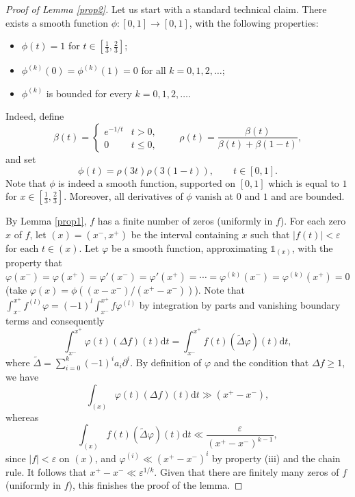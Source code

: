 \documentclass[12pt, a4paper]{amsart}
\theoremstyle{remark}
\newcommand{\ud}{\mathrm{d}}
\begin{document}
\begin{proof}[Proof of Lemma \ref{prop2}] Let us start with a standard technical claim.
    There exists a smooth function $\phi : [0, 1]\to [0, 1]$, with the following properties: \begin{itemize}
        \item[(i)] $\phi(t) = 1$ for $t\in[\frac{1}{3}, \frac23]$;
        \item[(ii)] $\phi^{(k)}(0) = \phi^{(k)}(1) = 0$ for all $k=0, 1, 2, \ldots$;
        \item[(iii)] $\phi^{(k)}$ is bounded for every $k=0, 1, 2, \ldots$.
    \end{itemize}
    Indeed, define
\begin{equation}\label{eq:rho}
\beta(t)=
\begin{cases}
e^{-1/t} & t>0,\\[2mm]
0 & t\le 0,
\end{cases}
\qquad
\rho(t)=\frac{\beta(t)}{\beta(t)+\beta(1-t)},
\end{equation}
and set
\[
\phi(t)=\rho\left(3t\right)\rho\left(3(1-t)\right),\qquad t\in [0, 1].
\]
Note that $\phi$ is indeed a smooth function, supported on $[0, 1]$ which is equal to $1$ for $x\in [\frac 13, \frac 23]$. Moreover, all derivatives of $\phi$ vanish at $0$ and $1$ and are bounded. 

By Lemma \ref{prop1}, $f$ has a finite number of zeros (uniformly in $f$). For each zero $x$ of $f$, let $(x) = (x^-, x^+)$ be the interval containing $x$ such that $\lvert f(t)\rvert<\varepsilon$ for each $t\in (x)$. Let $\varphi$ be a smooth function, approximating $\mathds1_{(x)}$, with the property that $\varphi(x^-) = \varphi(x^+)=\varphi'(x^-)=\varphi'(x^+) = \cdots = \varphi^{(k)}(x^-) = \varphi^{(k)}(x^+) = 0$ (take $\varphi(x) = \phi((x-x^{-})/(x^+ - x^-))$). Note that 
$\int_{x^-}^{x^+} f^{(l)}\varphi = (-1)^l\int_{x^-}^{x^+} f\varphi^{(l)}$ by integration by parts and vanishing boundary terms and consequently  
\begin{equation}\nonumber
    \int_{x^-}^{x^+} \varphi(t)(\Delta f)(t)\ud t = \int_{x^-}^{x^+} f(t)(\widetilde{\Delta}\varphi)(t)\ud t,
\end{equation}
where $\widetilde{\Delta} = \sum_{i=0}^k (-1)^i a_i\partial^i$. By definition of $\varphi$ and the condition that $\Delta f\geq 1$, we have 
\begin{equation}\nonumber
    \int_{(x)} \varphi(t)(\Delta f)(t)\ud t\gg (x^+ -x^-),
\end{equation} whereas 
\begin{equation}\nonumber
    \int_{(x)} f(t)(\widetilde{\Delta}\varphi )(t)\ud t\ll \frac{\varepsilon}{(x^+-x^-)^{k-1}},
\end{equation} since $\lvert f\rvert<\varepsilon$ on $(x)$, and $\varphi^{(i)}\ll (x^+-x^-)^i$ by property (iii) and the chain rule. It follows that $x^+ - x^-\ll \varepsilon^{1/k}$. Given that there are finitely many zeros of $f$ (uniformly in $f$), this finishes the proof of the lemma.\end{proof}
\end{document}
